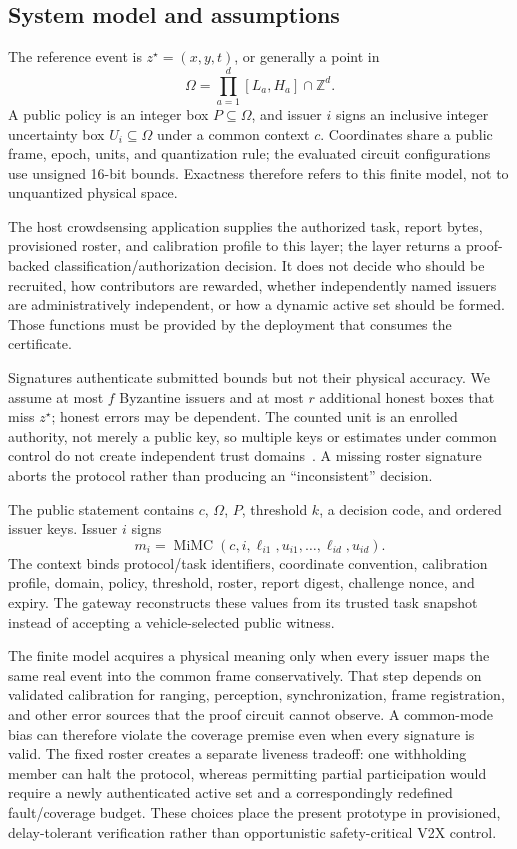 \documentclass[preprint,review,12pt]{elsarticle}
\begin{document}
\subsection{System model and assumptions}
The reference event is $z^\star=(x,y,t)$, or generally a point in
\begin{equation}
 \Omega=\prod_{a=1}^{d}[L_a,H_a]\cap\mathbb{Z}^d.
\end{equation}
A public policy is an integer box $P\subseteq\Omega$, and issuer $i$ signs an inclusive integer uncertainty box $U_i\subseteq\Omega$ under a common context $c$. Coordinates share a public frame, epoch, units, and quantization rule; the evaluated circuit configurations use unsigned 16-bit bounds. Exactness therefore refers to this finite model, not to unquantized physical space.

The host crowdsensing application supplies the authorized task, report bytes, provisioned roster, and calibration profile to this layer; the layer returns a proof-backed classification/authorization decision. It does not decide who should be recruited, how contributors are rewarded, whether independently named issuers are administratively independent, or how a dynamic active set should be formed. Those functions must be provided by the deployment that consumes the certificate.

Signatures authenticate submitted bounds but not their physical accuracy. We assume at most $f$ Byzantine issuers and at most $r$ additional honest boxes that miss $z^\star$; honest errors may be dependent. The counted unit is an enrolled authority, not merely a public key, so multiple keys or estimates under common control do not create independent trust domains~\cite{Zhang2025Sybil}. A missing roster signature aborts the protocol rather than producing an ``inconsistent'' decision.

The public statement contains $c$, $\Omega$, $P$, threshold $k$, a decision code, and ordered issuer keys. Issuer $i$ signs
\begin{equation}
 m_i=\operatorname{MiMC}(c,i,\ell_{i1},u_{i1},\ldots,\ell_{id},u_{id}).
\end{equation}
The context binds protocol/task identifiers, coordinate convention, calibration profile, domain, policy, threshold, roster, report digest, challenge nonce, and expiry. The gateway reconstructs these values from its trusted task snapshot instead of accepting a vehicle-selected public witness.

The finite model acquires a physical meaning only when every issuer maps the same real event into the common frame conservatively. That step depends on validated calibration for ranging, perception, synchronization, frame registration, and other error sources that the proof circuit cannot observe. A common-mode bias can therefore violate the coverage premise even when every signature is valid. The fixed roster creates a separate liveness tradeoff: one withholding member can halt the protocol, whereas permitting partial participation would require a newly authenticated active set and a correspondingly redefined fault/coverage budget. These choices place the present prototype in provisioned, delay-tolerant verification rather than opportunistic safety-critical V2X control.
\end{document}
